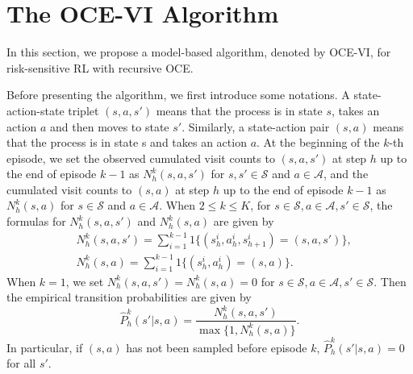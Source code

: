 \documentclass[11pt]{article}
\newcommand{\1}{\mathbbm{1}}
\begin{document}
\section{The OCE-VI Algorithm}\label{SECALG}
In this section, we propose a model-based algorithm, denoted by OCE-VI, for risk-sensitive RL with recursive OCE. 

Before presenting the algorithm, we first introduce some notations. A state-action-state triplet $(s,a,s')$ means that the process is in state $s$, takes an action $a$ and then moves to state $s'$. Similarly, a state-action pair $(s,a)$ means that the process is in state s and takes an action $a$. At the beginning of the $k$-th episode, we set the observed cumulated visit counts to $(s,a,s')$ at step $h$ up to the end of episode $k-1$ as $N_h^k(s,a,s')$ for $s,s'\in \mathcal{S}$ and $a\in \mathcal{A}$, and the cumulated visit counts to $(s,a)$ at step $h$ up to the end of episode $k-1$ as $N_h^k(s,a)$ for $s\in \mathcal{S}$ and $a\in \mathcal{A}$. When $2\leq k\leq K$, for $s\in \mathcal{S},a\in \mathcal{A},s'\in\mathcal{S}$, the formulas for $N_h^k(s,a,s')$ and $N_h^k(s,a)$ are given by
\begin{equation*}
\begin{aligned}
&N_h^k(s,a,s')=\sum_{i=1}^{k-1} \mathrm{1}\{(s_h^i,a_h^i,s_{h+1}^i)=(s,a,s')\}, \\ &N_h^k(s,a)=\sum_{i=1}^{k-1} \mathrm{1}\{(s_h^i,a_h^i)=(s,a)\}.
\end{aligned}
\end{equation*}
When $k=1$, we set $N_h^k(s,a,s')=N_h^k(s,a)=0$ for $s\in \mathcal{S},a\in \mathcal{A},s'\in\mathcal{S}$.
Then the empirical transition probabilities are given by
\begin{equation*}
\hat{P}^k_h(s'\vert s,a)=\frac{N_h^k(s,a,s')}{\max\{1,N^k_h(s,a)\}}.
\end{equation*}
In particular, if $(s,a)$ has not been sampled before episode $k$, $\hat{P}^k_h(s'\vert s,a) =0$ for all $s'.$
\end{document}
